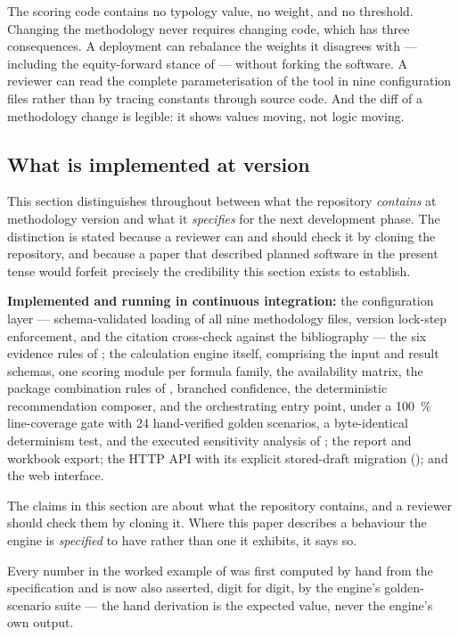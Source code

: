 The scoring code contains no typology value, no weight, and no threshold.
Changing the methodology never requires changing code, which has three
consequences. A deployment can rebalance the weights it disagrees with ---
including the equity-forward stance of  --- without
forking the software. A reviewer can read the complete parameterisation of the
tool in nine configuration files rather than by tracing constants through
source code.
And the diff of a methodology change is legible: it shows values moving, not
logic moving.

\subsection{What is implemented at version \methver{}}
\label{sec:implementation-status}

\begin{keynote}
\noindent This section distinguishes throughout between what the repository
\emph{contains} at methodology version \methver{} and what it \emph{specifies}
for the next development phase. The distinction is stated because a reviewer
can and should check it by cloning the repository, and because a paper that
described planned software in the present tense would forfeit precisely the
credibility this section exists to establish.

\textbf{Implemented and running in continuous integration:} the configuration
layer --- schema-validated loading of all nine methodology files, version
lock-step enforcement, and the citation cross-check against the bibliography ---
the six evidence rules of ; the calculation engine
itself, comprising the input and result schemas, one scoring module per formula
family, the availability matrix, the package combination rules of
, branched confidence, the deterministic recommendation
composer, and the orchestrating entry point, under a \SI{100}{\percent}
line-coverage gate with \num{24} hand-verified golden scenarios, a
byte-identical determinism test, and the executed sensitivity analysis of
; the report and workbook export; the HTTP API
with its explicit stored-draft migration (); and the web
interface.

The claims in this section are about what the repository contains, and a
reviewer should check them by cloning it. Where this paper describes a
behaviour the engine is \emph{specified} to have rather than one it exhibits,
it says so.

Every number in the worked example of  was first
computed by hand from the specification and is now also asserted, digit for
digit, by the engine's golden-scenario suite --- the hand derivation is the
expected value, never the engine's own output.
\end{keynote}

